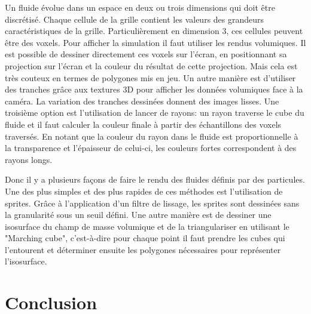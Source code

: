 \documentclass[11pt]{article}
\begin{document}
Un fluide évolue dans un espace en deux ou trois dimensions qui doit être discrétisé. Chaque cellule de la grille contient les valeurs des grandeurs caractéristiques de la grille. Particulièrement en dimension 3, ces cellules peuvent être des voxels. Pour afficher la simulation il faut utiliser les rendus volumiques. \newline
Il est possible de dessiner directement ces voxels sur l'écran, en positionnant sa projection sur l'écran et la couleur du résultat de cette projection. Mais cela est très couteux en termes de polygones mis en jeu.\newline
Un autre manière est d'utiliser des tranches grâce aux textures 3D pour afficher les données volumiques face à la caméra. La variation des tranches dessinées donnent des images lisses.\newline
Une troisième option est l'utilisation de lancer de rayons: un rayon traverse le cube du fluide et il faut calculer la couleur finale à partir des échantillons des voxels traversés. En notant que la couleur du rayon dans le fluide est proportionnelle à la transparence et l'épaisseur de celui-ci, les couleurs fortes correspondent à des rayons longs.

Donc il y a plusieurs façons de faire le rendu des fluides définis par des particules.\newline
Une des plus simples et des plus rapides de ces méthodes est l'utilisation de sprites. Grâce à l'application d'un filtre de lissage, les sprites sont dessinées sans la granularité sous un seuil défini. \newline
Une autre manière est de dessiner une isosurface du champ de masse volumique et de la triangulariser en utilisant le "Marching cube", c'est-à-dire pour chaque point il faut prendre les cubes qui l'entourent et déterminer ensuite les polygones nécessaires pour représenter l'isosurface.



\section{Conclusion}
\end{document}
